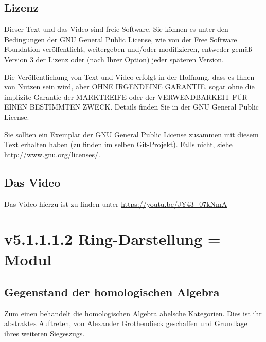 \documentclass[a4paper]{amsart}
\theoremstyle{definition}
\begin{document}
\subsection*{Lizenz}
Dieser Text und das Video sind freie Software. Sie können es unter den Bedingungen der
GNU General Public License, wie von der Free Software Foundation veröffentlicht, weitergeben
und/oder modifizieren, entweder gemäß Version 3 der Lizenz oder (nach Ihrer Option) jeder späteren Version.

Die Veröffentlichung von Text und Video erfolgt in der Hoffnung, dass es Ihnen von Nutzen sein wird,
aber OHNE IRGENDEINE GARANTIE, sogar ohne die implizite Garantie der MARKTREIFE oder der
VERWENDBARKEIT FÜR EINEN BESTIMMTEN ZWECK. Details finden Sie in der GNU General Public License.

Sie sollten ein Exemplar der GNU General Public License zusammen mit diesem Text erhalten haben
(zu finden im selben Git-Projekt).
Falls nicht, siehe \url{http://www.gnu.org/licenses/}.

\subsection*{Das Video}
Das Video hierzu ist zu finden unter
{\tiny
   \url{https://youtu.be/JY43_07kNmA}
}

\section{v5.1.1.1.2 Ring-Darstellung = Modul}

\subsection{Gegenstand der homologischen Algebra}
Zum einen behandelt die homologischen Algebra abelsche Kategorien. Dies ist ihr abstraktes Auftreten, von Alexander Grothendieck geschaffen und Grundlage ihres weiteren Siegeszugs.
\end{document}
